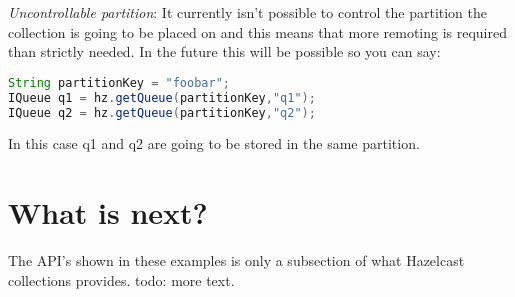 \emph{Uncontrollable partition}: It currently isn't possible to control the partition the collection is going to be placed on and this means that more remoting is required than strictly needed. In the future this will be possible so you can say:
\begin{lstlisting}[language=java]
String partitionKey = "foobar";
IQueue q1 = hz.getQueue(partitionKey,"q1");
IQueue q2 = hz.getQueue(partitionKey,"q2");
\end{lstlisting}
In this case q1 and q2 are going to be stored in the same partition.

\section{What is next?}
The API's shown in these examples is only a subsection of what Hazelcast collections provides. todo: more text.